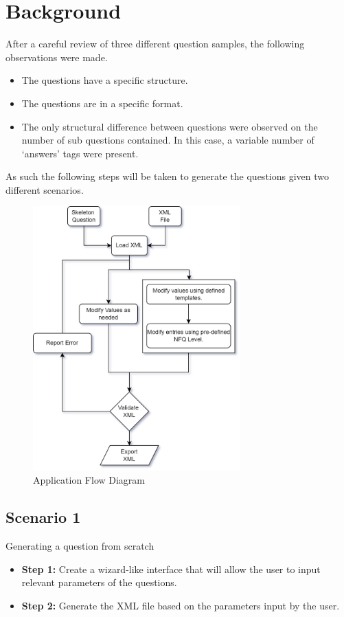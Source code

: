\documentclass[a4paper, 12pt]{article}
\begin{document}
\section{Background}
After a careful review of three different question samples, the following observations were made. 
\begin{itemize}
    \item The questions have a specific structure. 
    \item The questions are in a specific format.
    \item The only structural difference between questions were observed on the number of sub questions contained. In this case,
        a variable number of `answers' tags were present.
\end{itemize}
As such the following steps will be taken to generate the questions given two different scenarios.
\begin{figure}[h]
    \begin{center}
       \includegraphics[width=8cm]{images/app_diag.png} 
       \caption[]{Application Flow Diagram}\label{fig:app_diag}
    \end{center}
\end{figure}


\subsection{Scenario 1} Generating a question from scratch
\begin{itemize}
    \item \textbf{Step 1:} Create a wizard-like interface that will allow the user to input relevant parameters of the questions. 
    \item \textbf{Step 2:} Generate the XML file based on the parameters input by the user.
\end{itemize} 
\end{document}
